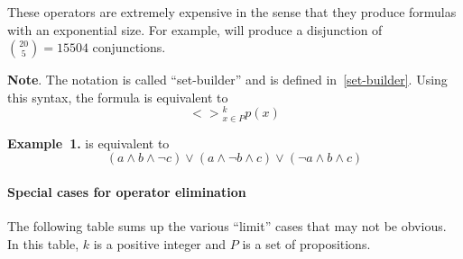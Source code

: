 \noindent These operators are extremely expensive in the sense that they produce formulas
with an exponential size. For example, 
will produce a disjunction of $\binom{20}{5} = 15 504$ conjunctions.%

\noindent\textbf{Note}.
The notation  is called \textquotedblleft{}set-builder\textquotedblright{} and is defined
in~\ref{set-builder}. Using this syntax, the formula 
is equivalent to%
\noindent\noindent\[{<>}_{x\in P}^k p(x)
\]%

\begin{mdbmarginx}{1ex}{0pt}{1ex}{0pt}%
\noindent\textbf{Example~1.} \mdbr
{} is equivalent to%
\noindent\noindent\[\left(a \wedge b \wedge \neg c\right) \vee \left(a \wedge \neg b \wedge c\right) \vee \left(\neg a \wedge b \wedge c\right)
\]%
\end{mdbmarginx}%

\paragraph{Special cases for operator elimination}\label{sec-special-cases-for-operator-elimination}%

\noindent The following table sums up the various \textquotedblleft{}limit\textquotedblright{} cases that may not be obvious.
In this table, $k$ is a positive integer and $P$ is a set of propositions.%

